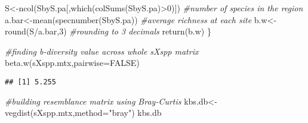\documentclass[
]{article}
\newenvironment{Shaded}{\begin{snugshade}}{\end{snugshade}}
\newcommand{\AttributeTok}[1]{\textcolor[rgb]{0.77,0.63,0.00}{#1}}
\newcommand{\CommentTok}[1]{\textcolor[rgb]{0.56,0.35,0.01}{\textit{#1}}}
\newcommand{\ConstantTok}[1]{\textcolor[rgb]{0.00,0.00,0.00}{#1}}
\newcommand{\DecValTok}[1]{\textcolor[rgb]{0.00,0.00,0.81}{#1}}
\newcommand{\FunctionTok}[1]{\textcolor[rgb]{0.00,0.00,0.00}{#1}}
\newcommand{\NormalTok}[1]{#1}
\newcommand{\OtherTok}[1]{\textcolor[rgb]{0.56,0.35,0.01}{#1}}
\newcommand{\SpecialCharTok}[1]{\textcolor[rgb]{0.00,0.00,0.00}{#1}}
\newcommand{\StringTok}[1]{\textcolor[rgb]{0.31,0.60,0.02}{#1}}
\begin{document}
\begin{Shaded}
\begin{Highlighting}[]
\NormalTok{  S}\OtherTok{\textless{}{-}}\FunctionTok{ncol}\NormalTok{(SbyS.pa[,}\FunctionTok{which}\NormalTok{(}\FunctionTok{colSums}\NormalTok{(SbyS.pa)}\SpecialCharTok{\textgreater{}}\DecValTok{0}\NormalTok{)]) }\CommentTok{\#number of species in the region}
\NormalTok{  a.bar}\OtherTok{\textless{}{-}}\FunctionTok{mean}\NormalTok{(}\FunctionTok{specnumber}\NormalTok{(SbyS.pa)) }\CommentTok{\#average richness at each site}
\NormalTok{  b.w}\OtherTok{\textless{}{-}}\FunctionTok{round}\NormalTok{(S}\SpecialCharTok{/}\NormalTok{a.bar,}\DecValTok{3}\NormalTok{) }\CommentTok{\#rounding to 3 decimals}
  \FunctionTok{return}\NormalTok{(b.w)}
\NormalTok{\}}

\CommentTok{\#finding b{-}diversity value across whole sXspp matrix}
\FunctionTok{beta.w}\NormalTok{(sXspp.mtx,}\AttributeTok{pairwise=}\ConstantTok{FALSE}\NormalTok{)}
\end{Highlighting}
\end{Shaded}

\begin{verbatim}
## [1] 5.255
\end{verbatim}

\begin{Shaded}
\begin{Highlighting}[]
\CommentTok{\#building resemblance matrix using Bray{-}Curtis}
\NormalTok{kbs.db}\OtherTok{\textless{}{-}}\FunctionTok{vegdist}\NormalTok{(sXspp.mtx,}\AttributeTok{method=}\StringTok{"bray"}\NormalTok{)}
\NormalTok{kbs.db}
\end{Highlighting}
\end{Shaded}
\end{document}
